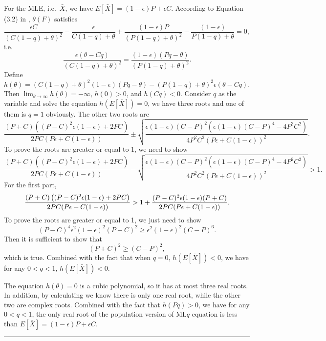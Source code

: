 \documentclass[a4paper]{article}
\newenvironment{proof}{{\bf Proof:  }}{\hfill\rule{2mm}{2mm}}
\begin{document}
\begin{proof}
For the MLE, i.e.\ $\bar{X}$, we have $E[\bar{X}] = (1-\epsilon) P + \epsilon C$.
According to Equation (3.2) in \citep{ferrari2010maximum}, $\theta(F)$ satisfies
\[
\frac{\epsilon C}{(C(1-q) + \theta)^2} - \frac{\epsilon}{C(1-q) + \theta}
+\frac{(1-\epsilon) P}{(P(1-q) + \theta)^2} - \frac{(1-\epsilon)}{P(1-q) + \theta}
= 0,
\]
i.e.\
\[
\frac{\epsilon (\theta - Cq)}{(C(1-q) + \theta)^2} =
\frac{(1-\epsilon) (P q - \theta)}{(P(1-q) + \theta)^2}.
\]
Define $h(\theta) = (C(1-q) + \theta)^2 (1-\epsilon) (P q - \theta) - (P(1-q) + \theta)^2 \epsilon (\theta - Cq)$.
Then $\lim_{\theta \to \infty}h(\theta) = -\infty$, $h(0) > 0$, and $h(Cq) < 0$.
Consider $q$ as the variable and solve the equation $h(E[\bar{X}]) = 0$, we have three roots and one of them is $q = 1$ obviously.
The other two roots are
\[
\frac{(P + C)\left( (P-C)^2 \epsilon(1-\epsilon) + 2PC \right)}{2PC(P \epsilon + C(1-\epsilon))}
\pm \sqrt{\frac{\epsilon(1-\epsilon)(C-P)^2\left(\epsilon(1-\epsilon)(C-P)^4 - 4P^2C^2\right)}{4 P^2 C^2 (P\epsilon + C(1-\epsilon))^2}}.
\]
To prove the roots are greater or equal to 1, we need to show
\[
\frac{(P + C)\left( (P-C)^2 \epsilon(1-\epsilon) + 2PC \right)}{2PC(P \epsilon + C(1-\epsilon))}
- \sqrt{\frac{\epsilon(1-\epsilon)(C-P)^2\left(\epsilon(1-\epsilon)(C-P)^4 - 4P^2C^2\right)}{4 P^2 C^2 (P\epsilon + C(1-\epsilon))^2}} > 1.
\]
For the first part,
\[
\frac{(P + C)\left( (P-C)^2 \epsilon(1-\epsilon) + 2PC \right)}{2PC(P \epsilon + C(1-\epsilon))}\\
> 1 + \frac{(P-C)^2 \epsilon (1-\epsilon) (P+C)}{2PC(P \epsilon + C(1-\epsilon))}.
\]
To prove the roots are greater or equal to 1, we just need to show
\[
(P-C)^4 \epsilon^2 (1-\epsilon)^2 (P+C)^2 \ge \epsilon^2(1-\epsilon)^2(C-P)^6.
\]
Then it is sufficient to show that
\[
(P+C)^2 \ge (C-P)^2,
\]
which is true.
Combined with the fact that when $q = 0$, $h(E[\bar{X}]) < 0$, we have for any $0 < q < 1$, $h(E[\bar{X}]) < 0$.

The equation $h(\theta) = 0$ is a cubic polynomial, so it has at most three real roots. In addition, by calculating we know there is only one real root, while the other two are complex roots. Combined with the fact that $h(P q) > 0$, we have for any $0 < q < 1$, the only real root of the population version of ML$q$ equation is less than $E[\bar{X}] = (1-\epsilon)P + \epsilon C$.
\end{proof}
\end{document}
